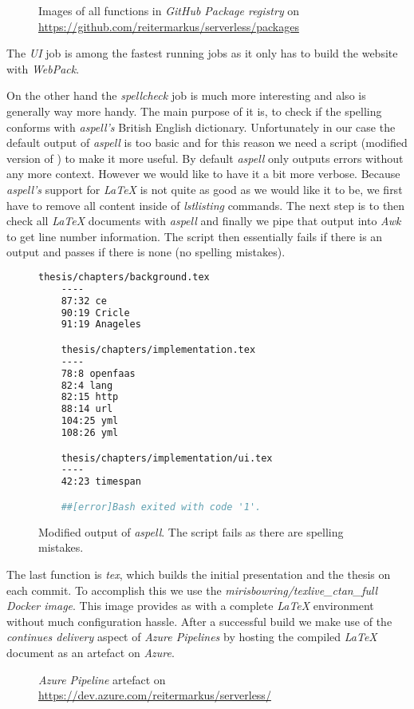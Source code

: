 \begin{figure}[H]
  \centering
  \caption{Images of all functions in \textit{GitHub Package registry} on \url{https://github.com/reitermarkus/serverless/packages}}
\end{figure}

The \textit{UI} job is among the fastest running jobs as it only has to build the website with
\textit{WebPack}.

On the other hand the \textit{spellcheck} job is much more interesting and also is generally way
more handy. The main purpose of it is, to check if the spelling conforms with \textit{aspell's}
British English dictionary. Unfortunately in our case the default output of \textit{aspell} is too
basic and for this reason we need a script (modified version of \cite{aspell-awk}) to make it more
useful. By default \textit{aspell} only outputs errors without any more context. However we would
like to have it a bit more verbose. Because \textit{aspell's} support for \textit{LaTeX} is not
quite as good as we would like it to be, we first have to remove all content inside of
\textit{lstlisting} commands. The next step is to then check all \textit{LaTeX} documents with
\textit{aspell} and finally we pipe that output into \textit{Awk} to get line number information.
The script then essentially fails if there is an output and passes if there is none (no spelling
mistakes).

\begin{figure}[H]
  \begin{lstlisting}[language=bash]
    thesis/chapters/background.tex
    ----
    87:32 ce
    90:19 Cricle
    91:19 Anageles

    thesis/chapters/implementation.tex
    ----
    78:8 openfaas
    82:4 lang
    82:15 http
    88:14 url
    104:25 yml
    108:26 yml

    thesis/chapters/implementation/ui.tex
    ----
    42:23 timespan

    ##[error]Bash exited with code '1'.
  \end{lstlisting}
  \caption{Modified output of \textit{aspell}. The script fails as there are spelling mistakes.}
\end{figure}

The last function is \textit{tex}, which builds the initial presentation and the thesis on each
commit. To accomplish this we use the \textit{mirisbowring/texlive\_ctan\_full Docker image}. This
image provides as with a complete \textit{LaTeX} environment without much configuration hassle.
After a successful build we make use of the \textit{continues delivery} aspect of \textit{Azure
Pipelines} by hosting the compiled \textit{LaTeX} document as an artefact on \textit{Azure}.

\begin{figure}[H]
  \centering
  \caption{\textit{Azure Pipeline} artefact on \url{https://dev.azure.com/reitermarkus/serverless/}}
\end{figure}

